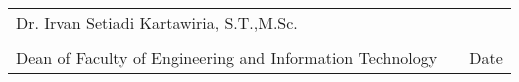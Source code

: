 \vspace{0.5in}

\begin{table}[ht!]    
  \begin{center}
    \begin{tabular}{ p{3.0in} p{0.3in} p{1.5in} }
      Dr. Irvan Setiadi Kartawiria, S.T.,M.Sc. & & \\
      \signrule & & \signrule \\
      Dean of Faculty of Engineering and Information Technology & & \centering Date
    \end{tabular}
  \end{center}
\end{table}